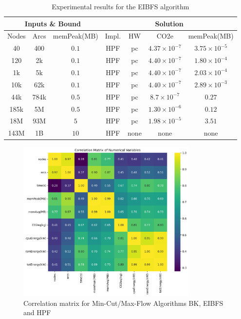 \documentclass[a4paper,singleside,12pt]{report} %
\begin{document}
\begin{table}[h!]
    \centering
    \begin{tabular}{|ccc|cccc|}
        \hline
        \multicolumn{3}{|c|}{Inputs \& Bound} & \multicolumn{4}{c|}{Solution} \\
        \hline
        Nodes & Arcs & memPeak(MB) & Impl. & HW & CO2e & memPeak(MB) \\
        \hline
        40 & 400 & $0.1$ & HPF & pc & $4.37 \times 10^{-7}$ & $3.75 \times 10^{-5}$ \\
        120 & 2k & $0.1$ & HPF & pc & $4.40 \times 10^{-7}$ & $1.80 \times 10^{-4}$ \\
        1k & 5k & $0.1$ & HPF & pc & $4.40 \times 10^{-7}$ & $2.03 \times 10^{-4}$ \\
        10k & 62k & $0.1$ & HPF & pc & $4.40 \times 10^{-7}$ & $2.89 \times 10^{-3}$ \\
        44k & 784k & $0.5$ & HPF & pc & $8.7 \times 10^{-7}$ & $0.27$ \\
        185k & 5M & $0.5$ & HPF & pc & $1.30 \times 10^{-6}$ & $0.12$ \\
        18M & 93M & $5$ & HPF & pc & $1.98 \times 10^{-5}$& $3.51$ \\
        143M & 1B & $10$ & HPF & none & none & none \\
        \hline
    \end{tabular}
    \caption{Experimental results for the EIBFS algorithm}
    \label{tab:hpf_results}
\end{table}

\begin{figure}[h!]
    \centering
    \includegraphics[width=0.8\textwidth]{imgs/max_flow_corr_mat.png}
    \caption{Correlation matrix for Min-Cut/Max-Flow Algorithms BK, EIBFS and HPF}
    \label{fig:max_flow_corr_mat}
\end{figure}
\end{document}
